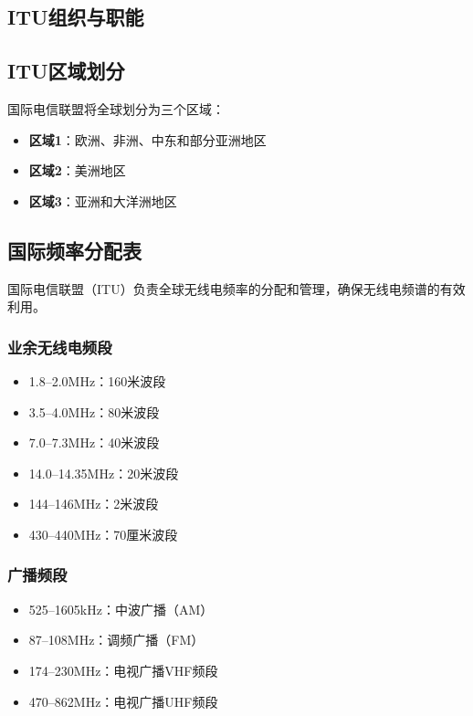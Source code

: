 \documentclass[12pt,UTF8]{ctexbook}
\begin{document}
\subsection{ITU组织与职能}

\subsection{ITU区域划分}
国际电信联盟将全球划分为三个区域：
\begin{itemize}[leftmargin=3.5em]
    \item \textbf{区域1}：欧洲、非洲、中东和部分亚洲地区
    \item \textbf{区域2}：美洲地区
    \item \textbf{区域3}：亚洲和大洋洲地区
\end{itemize}

\subsection{国际频率分配表}

国际电信联盟（ITU）负责全球无线电频率的分配和管理，确保无线电频谱的有效利用。

\subsubsection{业余无线电频段}
\begin{itemize}[leftmargin=3.5em]
    \item 1.8--2.0MHz：160米波段
    \item 3.5--4.0MHz：80米波段
    \item 7.0--7.3MHz：40米波段
    \item 14.0--14.35MHz：20米波段
    \item 144--146MHz：2米波段
    \item 430--440MHz：70厘米波段
\end{itemize}

\subsubsection{广播频段}
\begin{itemize}[leftmargin=3.5em]
    \item 525--1605kHz：中波广播（AM）
    \item 87--108MHz：调频广播（FM）
    \item 174--230MHz：电视广播VHF频段
    \item 470--862MHz：电视广播UHF频段
\end{itemize}
\end{document}
